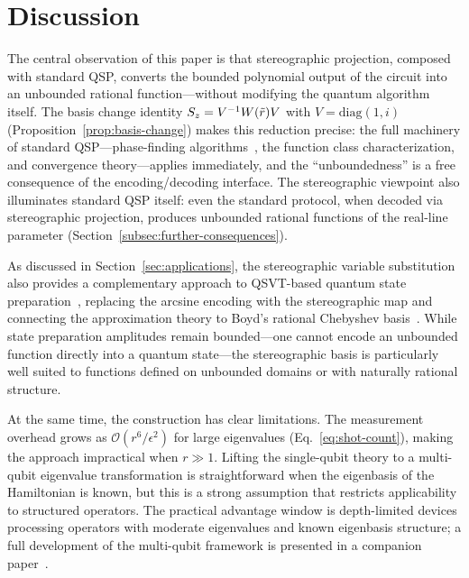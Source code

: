 \section{Discussion}
\label{sec:discussion}

The central observation of this paper is that stereographic
projection, composed with standard QSP, converts the bounded
polynomial output of the circuit into an unbounded rational
function---without modifying the quantum algorithm itself.  The
basis change identity
$S_z = V^{-1}W(\tilde{r})V$ with $V = \mathrm{diag}(1,i)$
(Proposition~\ref{prop:basis-change}) makes this reduction
precise: the full machinery of standard QSP---phase-finding
algorithms~\cite{DongMengWhaleyEtAl2021,Haah2019}, the
function class characterization, and convergence theory---applies
immediately, and the ``unboundedness'' is a free consequence of
the encoding/decoding interface.  The stereographic viewpoint
also illuminates standard QSP itself: even the standard
protocol, when decoded via stereographic projection, produces
unbounded rational functions of the real-line parameter
(Section~\ref{subsec:further-consequences}).

As discussed in Section~\ref{sec:applications}, the stereographic
variable substitution also provides a complementary approach to
QSVT-based quantum state
preparation~\cite{McArdleGilyenBerta2025}, replacing the arcsine
encoding with the stereographic map and connecting the
approximation theory to Boyd's rational Chebyshev
basis~\cite{Boyd1990,Boyd1987}.  While state preparation
amplitudes remain bounded---one cannot encode an unbounded function
directly into a quantum state---the stereographic basis is
particularly well suited to functions defined on unbounded domains
or with naturally rational structure.

At the same time, the construction has clear limitations.
The measurement overhead grows as
$\mathcal{O}(r^6/\epsilon^2)$ for large eigenvalues
(Eq.~\eqref{eq:shot-count}), making the approach impractical
when $r \gg 1$.  Lifting the single-qubit theory to a
multi-qubit eigenvalue transformation is straightforward when
the eigenbasis of the Hamiltonian is known, but this is a
strong assumption that restricts applicability to structured
operators.  The practical advantage window is depth-limited
devices processing operators with moderate eigenvalues and
known eigenbasis structure; a full development of the
multi-qubit framework is presented in a companion
paper~\cite{KharaziLeytonOrtega2026b}.

